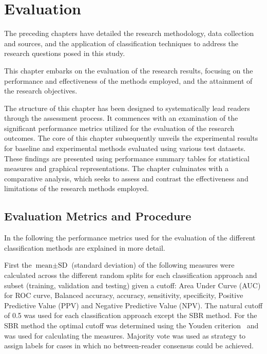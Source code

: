\section{Evaluation}
\label{sec:evaluation}

The preceding chapters have detailed the research methodology, data collection and sources, and the application of classification techniques 
to address the research questions posed in this study. 

This chapter embarks on the evaluation of the research results, focusing on the performance and effectiveness of the methods employed, 
and the attainment of the research objectives.

The structure of this chapter has been designed to systematically lead readers through the assessment process. 
It commences with an examination of the significant performance metrics utilized for the evaluation of 
the research outcomes.
The core of this chapter subsequently unveils the experimental results 
for baseline and experimental methods evaluated using various test datasets. 
These findings are presented using performance summary tables for statistical measures and graphical representations.
The chapter culminates with a comparative analysis, which seeks to assess and contrast the effectiveness and 
limitations of the research methods employed.


\subsection{Evaluation Metrics and Procedure}
\label{subsec:determinationInconcl}

In the following the performance metrics used for the evaluation of the different classification methods 
are explained in more detail.

First the $\text{mean} \pm \text{SD}$ (standard deviation) of the following measures were calculated across
the different random splits for each classification approach and subset (training, validation and testing) given a cutoff: 
Area Under Curve (AUC) for ROC curve, Balanced accuracy, accuracy, sensitivity, specificity, 
Positive Predictive Value (PPV) and Negative Predictive Value (NPV).
The natural cutoff of 0.5 was used for each classification approach except the SBR method.
For the SBR method the optimal cutoff was determined using the Youden criterion~\citep{Youden1950} and was used for
calculating the measures.
Majority vote was used as strategy to assign labels for cases in which no between-reader consensus could be achieved.

